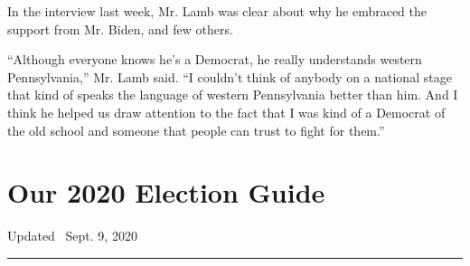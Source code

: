 In the interview last week, Mr. Lamb was clear about why he embraced the
support from Mr. Biden, and few others.

``Although everyone knows he's a Democrat, he really understands western
Pennsylvania,'' Mr. Lamb said. ``I couldn't think of anybody on a
national stage that kind of speaks the language of western Pennsylvania
better than him. And I think he helped us draw attention to the fact
that I was kind of a Democrat of the old school and someone that people
can trust to fight for them.''

\hypertarget{our-2020-election-guide}{%
\section{Our 2020 Election Guide}\label{our-2020-election-guide}}

Updated ~Sept. 9, 2020

\begin{center}\rule{0.5\linewidth}{\linethickness}\end{center}

